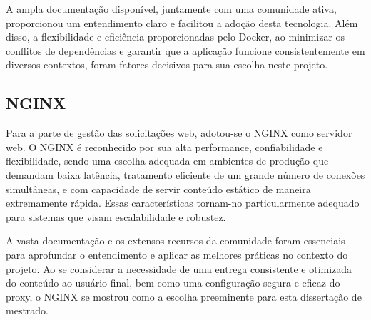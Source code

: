 A ampla documentação disponível, juntamente com uma comunidade ativa, proporcionou um entendimento claro e facilitou a adoção desta tecnologia. Além disso, a flexibilidade e eficiência proporcionadas pelo Docker, ao minimizar os conflitos de dependências e garantir que a aplicação funcione consistentemente em diversos contextos, foram fatores decisivos para sua escolha neste projeto.

\subsection{NGINX}
Para a parte de gestão das solicitações web, adotou-se o NGINX como servidor web. O NGINX é reconhecido por sua alta performance, confiabilidade e flexibilidade, sendo uma escolha adequada em ambientes de produção que demandam baixa latência, tratamento eficiente de um grande número de conexões simultâneas, e com capacidade de servir conteúdo estático de maneira extremamente rápida. Essas características tornam-no particularmente adequado para sistemas que visam escalabilidade e robustez. 

A vasta documentação e os extensos recursos da comunidade foram essenciais para aprofundar o entendimento e aplicar as melhores práticas no contexto do projeto. Ao se considerar a necessidade de uma entrega consistente e otimizada do conteúdo ao usuário final, bem como uma configuração segura e eficaz do proxy, o NGINX se mostrou como a escolha preeminente para esta dissertação de mestrado.
